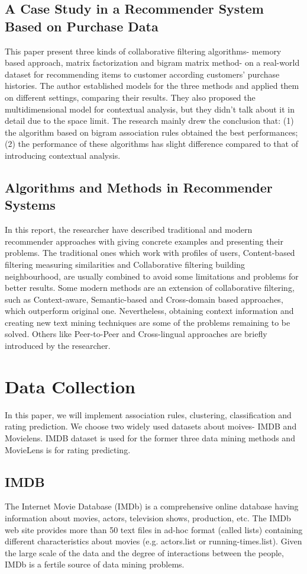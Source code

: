 \documentclass[conference]{IEEEtran}
\begin{document}
\subsection{A Case Study in a Recommender System Based on Purchase Data\cite{Bruno}}
This paper present three kinds of collaborative filtering algorithms- memory based approach, matrix factorization and bigram matrix method- on a real-world dataset for recommending items to customer according customers’ purchase histories. The author established models for the three methods and applied them on different settings, comparing their results. They also proposed the multidimensional model for contextual analysis, but they didn’t talk about it in detail due to the space limit. The research mainly drew the conclusion that: (1) the algorithm based on bigram association rules obtained the best performances; (2) the performance of these algorithms has slight difference compared to that of introducing contextual analysis.
\subsection{Algorithms and Methods in Recommender Systems\cite{Daniar}}
In this report, the researcher have described traditional and modern recommender approaches with giving concrete examples and presenting their problems. The traditional ones which work with profiles of users, Content-based filtering measuring similarities and Collaborative  filtering building neighbourhood, are usually combined to avoid some limitations and problems for better results. Some modern methods are an extension of collaborative filtering, such as Context-aware, Semantic-based and Cross-domain based approaches, which outperform original one. Nevertheless, obtaining context information and creating new text mining techniques are some of the problems remaining to be solved. Others like Peer-to-Peer and Cross-lingual approaches are briefly introduced by the researcher.

\section{Data Collection}
In this paper, we will implement association rules, clustering, classification and rating prediction. We choose two widely used datasets about moives- IMDB and Movielens. IMDB dataset is used for the former three data mining methods and MovieLens is for rating predicting.
\subsection{IMDB}
The Internet Movie Database (IMDb) is a comprehensive online database having information about movies, actors, television shows, production, etc. The IMDb web site\cite{imdb} provides more than 50 text files in ad-hoc format (called lists) containing different characteristics about movies (e.g. actors.list or running-times.list). Given the large scale of the data and the degree of interactions between the people, IMDb is a fertile source of data mining problems.
\end{document}
